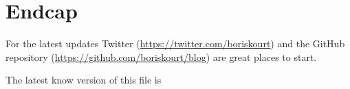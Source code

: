 \vspace{1in}
\section{Endcap}
For the latest updates Twitter (\url{https://twitter.com/boriskourt}) and the GitHub repository (\url{https://github.com/boriskourt/blog}) are great places to start.
\begin{flushright}
The latest know version of this file is \emph{\latestKnownVersion}
\end{flushright}

